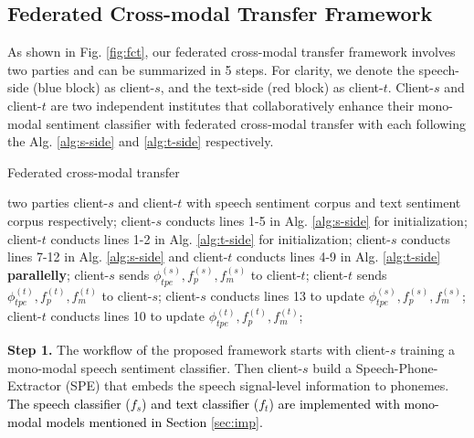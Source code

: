 \documentclass[11pt]{article}
\begin{document}
\subsection{Federated Cross-modal Transfer Framework}

As shown in Fig. \ref{fig:fct}, our federated cross-modal transfer framework involves two parties and can be summarized in 5 steps. For clarity, we denote the speech-side (blue block) as client-$s$, and the text-side (red block) as client-$t$. Client-$s$ and client-$t$ are two independent institutes that collaboratively enhance their mono-modal sentiment classifier with federated cross-modal transfer with each following the Alg. \ref{alg:s-side} and \ref{alg:t-side} respectively.


\setlength{\textfloatsep}{0pt}
\begin{algorithm}[ht]
\caption{Federated cross-modal transfer}
\label{alg:framework}
\begin{algorithmic}[1]
    \Require two parties client-$s$ and client-$t$ with speech sentiment corpus and text sentiment corpus respectively;
    \State client-$s$ conducts lines 1-5 in Alg. \ref{alg:s-side} for initialization;
    \State client-$t$ conducts lines 1-2 in Alg. \ref{alg:t-side} for initialization;
        \State client-$s$ conducts lines 7-12 in Alg. \ref{alg:s-side} and client-$t$ conducts lines 4-9 in Alg. \ref{alg:t-side} \textbf{parallelly};
        \State client-$s$ sends ${\phi}_{tpe}^{(s)}, {f}_{p}^{(s)}, {f}_m^{(s)}$ to client-$t$;
        \State client-$t$ sends ${\phi}_{tpe}^{(t)}, {f}_{p}^{(t)}, {f}_m^{(t)}$ to client-$s$;
        \State client-$s$ conducts lines 13 to update ${\phi}_{tpe}^{(s)}, {f}_{p}^{(s)}, {f}_m^{(s)}$;
        \State client-$t$ conducts lines 10 to update ${\phi}_{tpe}^{(t)}, {f}_{p}^{(t)}, {f}_m^{(t)}$;
    \EndWhile
\end{algorithmic}
\end{algorithm} %

\textbf{Step 1.} The workflow of the proposed framework starts with client-$s$ training a mono-modal speech sentiment classifier. Then client-$s$ build a Speech-Phone-Extractor (SPE) that embeds the speech signal-level information to phonemes. \textcolor{black}{The speech classifier (${f}_s$) and text classifier (${f}_t$) are implemented with mono-modal models mentioned in Section \ref{sec:imp}.}
\end{document}
